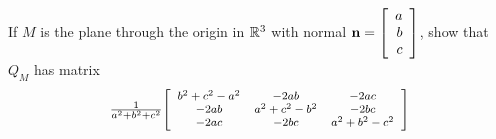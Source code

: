 \begin{multicols}{2}
\begin{ex}
If $M$ is the plane through the origin in $\mathbb{R}^3$ with normal $\textbf{n} = \left[
\begin{array}{r}
a\\
b\\
c 
\end{array}
\right]$, show that $Q_{M}$ has matrix
\begin{equation*}{\small
\tfrac{1}{a^2 + b^2 + c^2}}{\footnotesize \left[\begin{array}{ccc}
b^2 + c^2 - a^2 & -2ab & -2ac \\
-2ab & a^2 + c^2 - b^2 & -2bc \\
-2ac & -2bc & a^2 + b^2 - c^2
\end{array}
\right]}
\end{equation*}
\end{ex}
\end{multicols}
